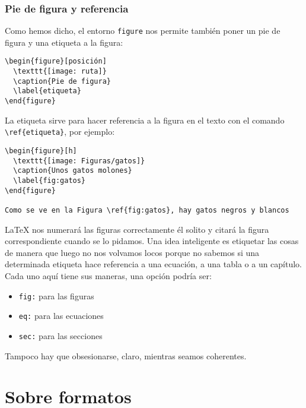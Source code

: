 \subsubsection{Pie de figura y referencia}\label{sec:caption}

Como hemos dicho, el entorno \lstinline!figure! nos permite también
poner un pie de figura y una etiqueta a la figura:

\begin{lstlisting}[language={[latex]tex}]
\begin{figure}[posición]
  \texttt{[image: ruta]}
  \caption{Pie de figura}
  \label{etiqueta}
\end{figure}
\end{lstlisting}

La etiqueta sirve para hacer referencia a la figura en el texto con el
comando \lstinline!\ref{etiqueta}!, por ejemplo:

\begin{lstlisting}[language={[latex]tex}]
\begin{figure}[h]
  \texttt{[image: Figuras/gatos]}
  \caption{Unos gatos molones}
  \label{fig:gatos}
\end{figure}

Como se ve en la Figura \ref{fig:gatos}, hay gatos negros y blancos
\end{lstlisting}

LaTeX nos numerará las figuras correctamente él solito y citará la
figura correspondiente cuando se lo pidamos. Una idea inteligente es
etiquetar las cosas de manera que luego no nos volvamos locos porque no
sabemos si una determinada etiqueta hace referencia a una ecuación, a
una tabla o a un capítulo. Cada uno aquí tiene sus maneras, una opción
podría ser:

\begin{itemize}
\item
  \lstinline!fig:! para las figuras
\item
  \lstinline!eq:! para las ecuaciones
\item
  \lstinline!sec:! para las secciones
\end{itemize}

Tampoco hay que obsesionarse, claro, mientras seamos coherentes.

\section{Sobre formatos}\label{sec:formatos}

